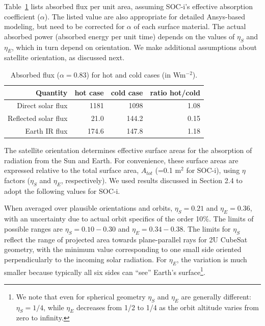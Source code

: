 \documentclass[]{aastex62}
\begin{document}
Table~\ref{tab:inputflux} lists absorbed flux per unit area, assuming SOC-i's effective 
absorption coefficient ($\alpha$). The listed value are also appropriate for detailed 
Ansys-based modeling, but need to be corrected for $\alpha$ of each surface material.
The actual absorbed power (absorbed energy per unit time) depends on 
the values of $\eta_S$ and $\eta_E$, which in turn depend on orientation. We make additional 
assumptions about satellite orientation, as discussed next. 

\begin{table}[t]
	\centering
	\caption{Absorbed flux ($\alpha=0.83$) for hot and cold cases (in  Wm$^{-2}$). }
	\label{tab:inputflux}
	\begin{tabular}{r|r|r|r} %
		\hline
  	                    Quantity  & hot case   &   cold  case &   ratio hot/cold    \\
		\hline
              Direct solar flux    &    1181        &     1098         &     1.08       \\
           Reflected solar flux  &     21.0        &     144.2        &     0.15     \\    
                       Earth IR flux  &   174.6       &     147.8        &     1.18      \\
		\hline
	\end{tabular} 
\end{table}



\vskip 0.1in 

The satellite orientation determines effective surface areas for the absorption of radiation from 
the Sun and Earth. For convenience, these surface areas are expressed relative to the total surface area, $A_{tot}$
(=0.1 m$^2$ for SOC-i), using $\eta$ factors ($\eta_S$ and $\eta_E$, respectively).  
We used results discussed in Section 2.4 to adopt the following values for SOC-i.

When averaged over plausible orientations and orbits, $\eta_S = 0.21$ and $\eta_E = 0.36$, 
with an uncertainty due to actual orbit specifics of the order 10\%. The limits of 
possible ranges are  $\eta_S = 0.10 - 0.30$ and $\eta_E = 0.34 - 0.38$. The limits for 
$\eta_S$ reflect the range of projected area towards plane-parallel rays for 2U CubeSat geometry, 
with the minimum value corresponding to one small side oriented perpendicularly to the incoming 
solar radiation. For $\eta_E$, the variation is much smaller because typically all six sides can 
``see'' Earth's surface\footnote{We note that even for spherical geometry $\eta_S$ and $\eta_E$
are generally different:  $\eta_S=1/4$, while $\eta_E$ decreases from 1/2 to 1/4 as the orbit
altitude varies from zero to infinity.}. 
 
\end{document}
